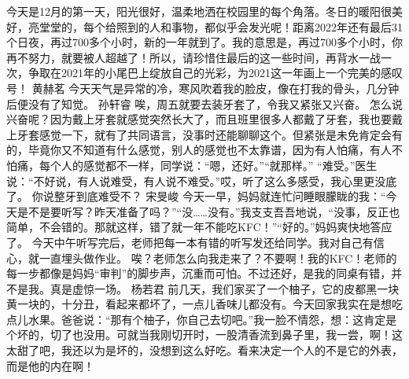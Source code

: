 {}今天是12月的第一天，阳光很好，温柔地洒在校园里的每个角落。冬日的暖阳很美好，亮堂堂的，每个给照到的人和事物，都似乎会发光呢！距离2022年还有最后31个日夜，再过700多个小时，新的一年就到了。我的意思是，再过700多个小时，你再不努力，就要被人超越了！所以，请珍惜住最后的这一些时间，再背水一战一次，争取在2021年的小尾巴上绽放自己的光彩，为2021这一年画上一个完美的感叹号！\markdownRendererInterblockSeparator
{}\markdownRendererInterblockSeparator
{}黄赫茗\markdownRendererInterblockSeparator
{}今天天气是异常的冷，寒风吹着我的脸皮，像在打我的骨头，几分钟后便没有了知觉。\markdownRendererInterblockSeparator
{}\markdownRendererInterblockSeparator
{}孙轩睿\markdownRendererInterblockSeparator
{}唉，周五就要去装牙套了，令我又紧张又兴奋。\markdownRendererInterblockSeparator
{}怎么说兴奋呢？因为戴上牙套就感觉突然长大了，而且班里很多人都戴了牙套，我也要戴上牙套感觉一下，就有了共同语言，没事时还能聊聊这个。但紧张是未免肯定会有的，毕竟你又不知道有什么感觉，别人的感觉也不太靠谱，因为有人怕痛，有人不怕痛，每个人的感觉都不一样，同学说：“嗯，还好。”“就那样。”\markdownRendererInterblockSeparator
{}“难受。”医生说：“不好说，有人说难受，有人说不难受。”哎，听了这么多感受，我心里更没底了。\markdownRendererInterblockSeparator
{}你说整牙到底难受不？\markdownRendererInterblockSeparator
{}\markdownRendererInterblockSeparator
{}宋旻峻\markdownRendererInterblockSeparator
{}今天一早，妈妈就连忙问睡眼朦眬的我：“今天是不是要听写？昨天准备了吗？”“没……没有。”我支支吾吾地说，“没事，反正也简单，不会错的。那就这样，错了就一年不能吃KFC！”“好的。”妈妈爽快地答应了。 \markdownRendererInterblockSeparator
{}今天中午听写完后，老师把每一本有错的听写发还给同学。我对自己有信心，就一直埋头做作业。 唉？老师怎么向我走来了？不要啊！我的KFC！老师的每一步都像是妈妈“审判”的脚步声，沉重而可怕。不过还好，是我的同桌有错，并不是我。真是虚惊一场。\markdownRendererInterblockSeparator
{}\markdownRendererInterblockSeparator
{}杨若君\markdownRendererInterblockSeparator
{}前几天，我们家买了一个柚子，它的皮都黑一块黄一块的，十分丑，看起来都坏了，一点儿香味儿都没有。今天回家我实在是想吃点儿水果。爸爸说：“那有个柚子，你自己去切吧。”我一脸不情怨，想：这肯定是个坏的，切了也没用。可就当我刚切开时，一股清香流到鼻子里，我一尝，啊！这太甜了吧，我还以为是坏的，没想到这么好吃。看来决定一个人的不是它的外表，而是他的内在啊！\markdownRendererInterblockSeparator
{}\markdownRendererInterblockSeparator
